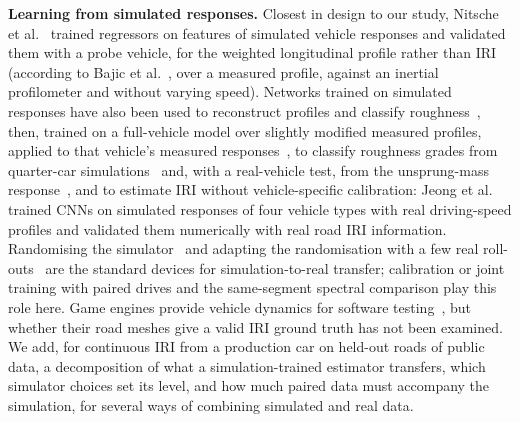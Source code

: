 \textbf{Learning from simulated responses.}
Closest in design to our study, Nitsche et al.~\cite{nitsche2014wlp} trained regressors on features of simulated vehicle responses and validated them with a probe vehicle, for the weighted longitudinal profile rather than IRI (according to Bajic et al.~\cite{bajic2021ml}, over a measured profile, against an inertial profilometer and without varying speed).
Networks trained on simulated responses have also been used to reconstruct profiles and classify roughness~\cite{ngwangwa2010ann}, then, trained on a full-vehicle model over slightly modified measured profiles, applied to that vehicle's measured responses~\cite{ngwangwa2014exp}, to classify roughness grades from quarter-car simulations~\cite{rcnn2023sim} and, with a real-vehicle test, from the unsprung-mass response~\cite{speedadaptive2025}, and to estimate IRI without vehicle-specific calibration: Jeong et al.~\cite{jeong2020cnn} trained CNNs on simulated responses of four vehicle types with real driving-speed profiles and validated them numerically with real road IRI information.
Randomising the simulator~\cite{tobin2017dr,peng2018dr} and adapting the randomisation with a few real roll-outs~\cite{chebotar2019simopt} are the standard devices for simulation-to-real transfer; calibration or joint training with paired drives and the same-segment spectral comparison play this role here.
Game engines provide vehicle dynamics for software testing~\cite{gambi2019beamng,beamng}, but whether their road meshes give a valid IRI ground truth has not been examined.
We add, for continuous IRI from a production car on held-out roads of public data, a decomposition of what a simulation-trained estimator transfers, which simulator choices set its level, and how much paired data must accompany the simulation, for several ways of combining simulated and real data.
